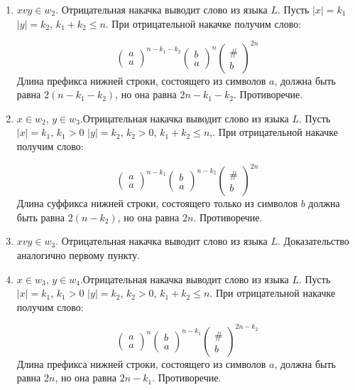 \documentclass[a4paper, 14pt]{article}
\begin{document}
\begin{enumerate}
	\item{$xvy \in w_2$}. Отрицательная накачка выводит слово из языка $L$. Пусть $| x | = k_1$ $| y | = k_2$, $k_1 + k_2 \leq n$. При отрицательной накачке получим слово:

		\[
		\begin{pmatrix}
			a\\
			a
		\end{pmatrix}^{n - k_1 - k_2}	
		\begin{pmatrix}
			b\\
			a
		\end{pmatrix}^n
		\begin{pmatrix}
			\# \\
			b	
		\end{pmatrix}^{2n}		
		\]
	Длина префикса нижней строки, состоящего из символов $a$, должна быть равна $2(n - k_1 - k_2)$, но она равна $2n - k_1 - k_2$. Противоречие.
	\item{$x \in w_2$, $y \in w_3$}.Отрицательная накачка выводит слово из языка $L$. Пусть $| x | = k_1$, $k_1 > 0$ $| y | = k_2$, $k_2 > 0$, $k_1 + k_2 \leq n$,. При отрицательной накачке получим слово:

		\[
		\begin{pmatrix}
			a\\
			a
		\end{pmatrix}^{n - k_1}	
		\begin{pmatrix}
			b\\
			a
		\end{pmatrix}^{n - k_2}
		\begin{pmatrix}
			\# \\
			b	
		\end{pmatrix}^{2n}		
		\]
		Длина суффикса нижней строки, состоящего только из символов $b$ должна быть равна $2(n - k_2)$, но она равна $2n$. Противоречие. 

	\item{$xvy \in w_3$}. Отрицательная накачка выводит слово из языка $L$. Доказательство аналогично первому пункту.
	\item{$x \in w_3$, $y \in w_4$}.Отрицательная накачка выводит слово из языка $L$. Пусть $| x | = k_1$, $k_1 > 0$ $| y | = k_2$, $k_2 > 0$, $k_1 + k_2 \leq n$. При отрицательной накачке получим слово:

		\[
		\begin{pmatrix}
			a\\
			a
		\end{pmatrix}^{n}	
		\begin{pmatrix}
			b\\
			a
		\end{pmatrix}^{n - k_1}
		\begin{pmatrix}
			\# \\
			b	
		\end{pmatrix}^{2n - k_2}		
		\]
		Длина префикса нижней строки, состоящего из символов $a$, должна быть равна $2n$, но она равна $2n - k_1$. Противоречие.


\end{enumerate}
\end{document}
